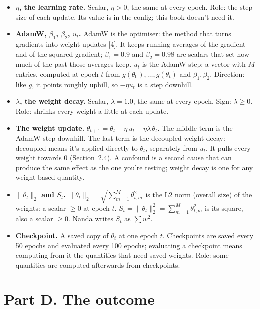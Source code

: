 \documentclass[11pt,a4paper,oneside,openany]{report}
\newcommand{\gl}[1]{\textbf{#1}}   %
\newenvironment{glist}{\begin{itemize}\setlength{\itemsep}{2pt}\setlength{\parskip}{1pt}}{\end{itemize}}
\begin{document}
\begin{glist}
\item[\gl{N17}] \textbf{$\eta$, the learning rate.} Scalar, $\eta > 0$, the same at every epoch. Role: the step size of each update. Its value is in the config; this book doesn't need it.
\item[\gl{N18}] \textbf{AdamW, $\beta_1$, $\beta_2$, $u_t$.} AdamW is the optimiser: the method that turns gradients into weight updates [4]. It keeps running averages of the gradient and of the squared gradient; $\beta_1 = 0.9$ and $\beta_2 = 0.98$ are scalars that set how much of the past those averages keep. $u_t$ is the AdamW step: a vector with $M$ entries, computed at epoch $t$ from $g(\theta_0), \ldots, g(\theta_t)$ and $\beta_1, \beta_2$. Direction: like $g$, it points roughly uphill, so $-\eta u_t$ is a step downhill.
\item[\gl{N19}] \textbf{$\lambda$, the weight decay.} Scalar, $\lambda = 1.0$, the same at every epoch. Sign: $\lambda \ge 0$. Role: shrinks every weight a little at each update.
\item[\gl{N20}] \textbf{The weight update.} $\theta_{t+1} = \theta_t - \eta\, u_t - \eta \lambda\, \theta_t$. The middle term is the AdamW step downhill. The last term is the decoupled weight decay: decoupled means it's applied directly to $\theta_t$, separately from $u_t$. It pulls every weight towards 0 (Section~2.4). A confound is a second cause that can produce the same effect as the one you're testing; weight decay is one for any weight-based quantity.
\item[\gl{N21}] \textbf{$\lVert\theta_t\rVert_2$ and $S_t$.} $\lVert\theta_t\rVert_2 = \sqrt{\sum_{m=1}^{M} \theta_{t,m}^2}$ is the L2 norm (overall size) of the weights: a scalar $\ge 0$ at epoch $t$. $S_t = \lVert\theta_t\rVert_2^2 = \sum_{m=1}^{M} \theta_{t,m}^2$ is its square, also a scalar $\ge 0$. Nanda writes $S_t$ as $\sum w^2$.
\item[\gl{N22}] \textbf{Checkpoint.} A saved copy of $\theta_t$ at one epoch $t$. Checkpoints are saved every 50 epochs and evaluated every 100 epochs; evaluating a checkpoint means computing from it the quantities that need saved weights. Role: some quantities are computed afterwards from checkpoints.
\end{glist}

\section*{Part D. The outcome}
\end{document}
